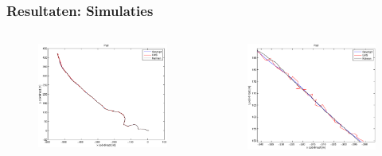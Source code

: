 \documentclass{beamer}
\begin{document}
  \begin{frame}
    \frametitle{Resultaten: Simulaties}
    \begin{columns}[c]
      \begin{column}{.5\textwidth}
        \begin{figure}
          \begin{center}
            \includegraphics[width=\linewidth]{images/simulatie_pad.eps}
          \end{center}
        \end{figure}
      \end{column}
      \begin{column}{.5\textwidth}
        \begin{figure}
          \begin{center}
            \includegraphics[width=\linewidth]{images/simulatie_pad_zoom.eps}
          \end{center}
        \end{figure}
      \end{column}
    \end{columns}
  \end{frame}
\end{document}
